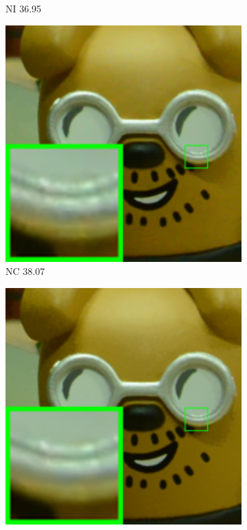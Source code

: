 \begin{figure}
\begin{subfigure}[t]{0.19\textwidth}
\caption{NI 36.95}
    \end{subfigure}
\hfill
    \begin{subfigure}[t]{0.19\textwidth}
        \centering
        \includegraphics[width=1\textwidth]{images/twsc/cc/resize_br_NC_d800_iso3200_1_real.png}
		\caption{NC 38.07}
    \end{subfigure}
    \hfill
    \begin{subfigure}[t]{0.19\textwidth}
        \centering
        \includegraphics[width=1\textwidth]{images/twsc/cc/resize_br_CCNoise_d800_iso3200_1.png}

\end{subfigure}
\end{figure}
